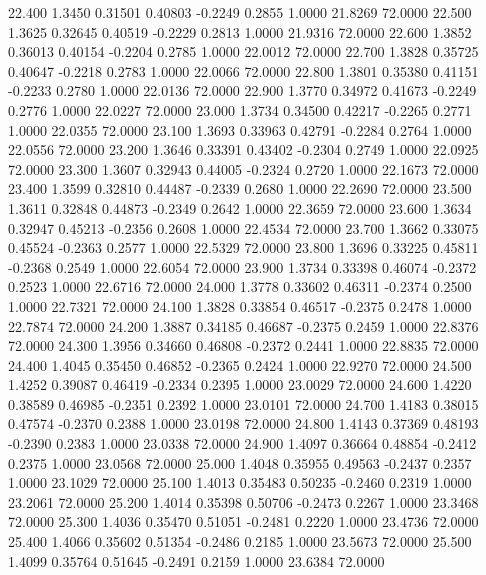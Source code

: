   22.400   1.3450   0.31501   0.40803  -0.2249   0.2855   1.0000  21.8269  72.0000
  22.500   1.3625   0.32645   0.40519  -0.2229   0.2813   1.0000  21.9316  72.0000
  22.600   1.3852   0.36013   0.40154  -0.2204   0.2785   1.0000  22.0012  72.0000
  22.700   1.3828   0.35725   0.40647  -0.2218   0.2783   1.0000  22.0066  72.0000
  22.800   1.3801   0.35380   0.41151  -0.2233   0.2780   1.0000  22.0136  72.0000
  22.900   1.3770   0.34972   0.41673  -0.2249   0.2776   1.0000  22.0227  72.0000
  23.000   1.3734   0.34500   0.42217  -0.2265   0.2771   1.0000  22.0355  72.0000
  23.100   1.3693   0.33963   0.42791  -0.2284   0.2764   1.0000  22.0556  72.0000
  23.200   1.3646   0.33391   0.43402  -0.2304   0.2749   1.0000  22.0925  72.0000
  23.300   1.3607   0.32943   0.44005  -0.2324   0.2720   1.0000  22.1673  72.0000
  23.400   1.3599   0.32810   0.44487  -0.2339   0.2680   1.0000  22.2690  72.0000
  23.500   1.3611   0.32848   0.44873  -0.2349   0.2642   1.0000  22.3659  72.0000
  23.600   1.3634   0.32947   0.45213  -0.2356   0.2608   1.0000  22.4534  72.0000
  23.700   1.3662   0.33075   0.45524  -0.2363   0.2577   1.0000  22.5329  72.0000
  23.800   1.3696   0.33225   0.45811  -0.2368   0.2549   1.0000  22.6054  72.0000
  23.900   1.3734   0.33398   0.46074  -0.2372   0.2523   1.0000  22.6716  72.0000
  24.000   1.3778   0.33602   0.46311  -0.2374   0.2500   1.0000  22.7321  72.0000
  24.100   1.3828   0.33854   0.46517  -0.2375   0.2478   1.0000  22.7874  72.0000
  24.200   1.3887   0.34185   0.46687  -0.2375   0.2459   1.0000  22.8376  72.0000
  24.300   1.3956   0.34660   0.46808  -0.2372   0.2441   1.0000  22.8835  72.0000
  24.400   1.4045   0.35450   0.46852  -0.2365   0.2424   1.0000  22.9270  72.0000
  24.500   1.4252   0.39087   0.46419  -0.2334   0.2395   1.0000  23.0029  72.0000
  24.600   1.4220   0.38589   0.46985  -0.2351   0.2392   1.0000  23.0101  72.0000
  24.700   1.4183   0.38015   0.47574  -0.2370   0.2388   1.0000  23.0198  72.0000
  24.800   1.4143   0.37369   0.48193  -0.2390   0.2383   1.0000  23.0338  72.0000
  24.900   1.4097   0.36664   0.48854  -0.2412   0.2375   1.0000  23.0568  72.0000
  25.000   1.4048   0.35955   0.49563  -0.2437   0.2357   1.0000  23.1029  72.0000
  25.100   1.4013   0.35483   0.50235  -0.2460   0.2319   1.0000  23.2061  72.0000
  25.200   1.4014   0.35398   0.50706  -0.2473   0.2267   1.0000  23.3468  72.0000
  25.300   1.4036   0.35470   0.51051  -0.2481   0.2220   1.0000  23.4736  72.0000
  25.400   1.4066   0.35602   0.51354  -0.2486   0.2185   1.0000  23.5673  72.0000
  25.500   1.4099   0.35764   0.51645  -0.2491   0.2159   1.0000  23.6384  72.0000

